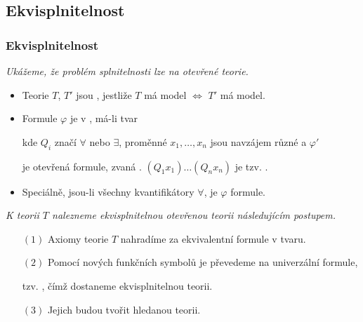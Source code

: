 
\subsection{Ekvisplnitelnost}\todo

\subsubsection*{Ekvisplnitelnost}
    {\it Ukážeme, že problém splnitelnosti lze  na otevřené teorie.}
    \vspace{0.5mm}
    
    \begin{itemize}
    \item Teorie $T$, $T'$ jsou , jestliže $T$ má model $\Leftrightarrow$ $T'$ má model.
    \smallskip
    
    \item Formule $\varphi$ je v , má-li tvar
    \vspace{-2mm}
    
    \vspace{-6mm}
    kde $Q_i$ značí $\forall$ nebo $\exists$, proměnné $x_1,\dots,x_n$ jsou navzájem různé a $\varphi'$
    \smallskip
    
    je otevřená formule, zvaná . $(Q_1x_1)\dots(Q_nx_n)$ je tzv. .
    \smallskip
    
    \item Speciálně, jsou-li všechny kvantifikátory $\forall$, je $\varphi$  formule.
    \end{itemize}
    \medskip
    
    {\it K teorii $T$ nalezneme ekvisplnitelnou otevřenou teorii následujícím postupem.}
    \vspace{0.5mm}
    
    \begin{enumerate}
    \item[$(1)$] Axiomy teorie $T$ nahradíme za ekvivalentní formule v  tvaru.
    \smallskip
    
    \item[$(2)$] Pomocí nových funkčních symbolů je převedeme na univerzální formule,
    \smallskip
    
    tzv. , čímž dostaneme ekvisplnitelnou teorii.
    \smallskip
    
    \item[$(3)$] Jejich  budou tvořit hledanou teorii.
    \end{enumerate}
    
